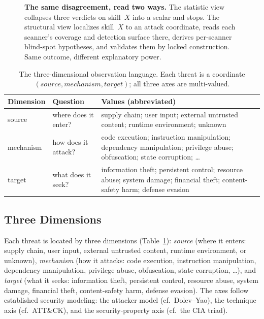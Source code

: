 \documentclass[sigconf,nonacm]{acmart}
\begin{document}
\begin{figure}[t]
\caption{\textbf{The same disagreement, read two ways.} The statistic view collapses three verdicts on skill~$X$ into a scalar and stops. The structural view localizes skill~$X$ to an attack coordinate, reads each scanner's coverage and detection surface there, derives per-scanner blind-spot hypotheses, and validates them by locked construction. Same outcome, different explanatory power.}
\label{fig:pipeline}
\end{figure}

\begin{table}[t]
\caption{The three-dimensional observation language. Each threat is a coordinate $(source, mechanism, target)$; all three axes are multi-valued.}
\label{tab:dims}
\small
\begin{tabular}{@{}p{1.2cm}p{1.9cm}p{4.6cm}@{}}
\toprule
Dimension & Question & Values (abbreviated) \\
\midrule
source & where does it enter? & supply chain; user input; external untrusted content; runtime environment; unknown \\
mechanism & how does it attack? & code execution; instruction manipulation; dependency manipulation; privilege abuse; obfuscation; state corruption; \ldots \\
target & what does it seek? & information theft; persistent control; resource abuse; system damage; financial theft; content-safety harm; defense evasion \\
\bottomrule
\end{tabular}
\end{table}

\subsection{Three Dimensions}
Each threat is located by three dimensions (Table~\ref{tab:dims}): \emph{source} (where it enters: supply chain, user input, external untrusted content, runtime environment, or unknown), \emph{mechanism} (how it attacks: code execution, instruction manipulation, dependency manipulation, privilege abuse, obfuscation, state corruption, \ldots), and \emph{target} (what it seeks: information theft, persistent control, resource abuse, system damage, financial theft, content-safety harm, defense evasion). The axes follow established security modeling: the attacker model (cf.\ Dolev--Yao), the technique axis (cf.\ ATT\&CK), and the security-property axis (cf.\ the CIA triad).
\end{document}
